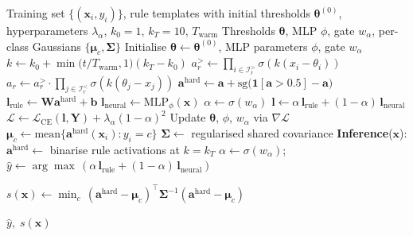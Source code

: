 \documentclass[conference]{IEEEtran}
\begin{document}
\begin{algorithm}[!ht]
\caption{NeSy-NIDS Training and OOD Scoring}
\label{alg:nesy}
\begin{algorithmic}[1]
\Require Training set $\{(\mathbf{x}_i, y_i)\}$, rule templates with
         initial thresholds $\boldsymbol{\theta}^{(0)}$,
         hyperparameters $\lambda_\alpha$,
         $k_0{=}1$, $k_T{=}10$, $T_{\mathrm{warm}}$
\Ensure  Thresholds $\boldsymbol{\theta}$, MLP $\phi$, gate $w_\alpha$,
         per-class Gaussians $\{\boldsymbol{\mu}_c, \boldsymbol{\Sigma}\}$
\State Initialise $\boldsymbol{\theta} \gets \boldsymbol{\theta}^{(0)}$,
       MLP parameters $\phi$, gate $w_\alpha$
  \State $k \gets k_0 + \min\!\bigl(t/T_{\mathrm{warm}},1\bigr)(k_T - k_0)$
      \State $a_r^{>} \gets \prod_{i\in\mathcal{I}_r^{>}}\!\sigma(k(x_i{-}\theta_i))$
      \State $a_r \gets a_r^{>} \cdot \prod_{j\in\mathcal{I}_r^{<}}\!\sigma(k(\theta_j{-}x_j))$
    \EndFor
    \State $\mathbf{a}^{\!\mathrm{hard}} \gets \mathbf{a}
           + \mathrm{sg}\!\bigl(\mathbf{1}[\mathbf{a}{>}0.5]-\mathbf{a}\bigr)$
    \State $\mathbf{l}_{\mathrm{rule}} \gets \mathbf{W}\mathbf{a}^{\mathrm{hard}}\!+\!\mathbf{b}$
    \State $\mathbf{l}_{\mathrm{neural}} \gets \mathrm{MLP}_\phi(\mathbf{x})$
    \State $\alpha \gets \sigma(w_\alpha)$
    \State $\mathbf{l} \gets \alpha\,\mathbf{l}_{\mathrm{rule}} + (1{-}\alpha)\,\mathbf{l}_{\mathrm{neural}}$
    \State $\mathcal{L} \gets \mathcal{L}_{\mathrm{CE}}(\mathbf{l},\mathbf{Y}) + \lambda_\alpha(1{-}\alpha)^2$
    \State Update $\boldsymbol{\theta}$, $\phi$, $w_\alpha$ via $\nabla\mathcal{L}$
  \EndFor
\EndFor
{} 
  \State $\boldsymbol{\mu}_c \gets \mathrm{mean}\{\mathbf{a}^{\mathrm{hard}}(\mathbf{x}_i) : y_i = c\}$
\EndFor
\State $\boldsymbol{\Sigma} \gets$ regularised shared covariance
\Statex
\Statex \textbf{Inference}($\mathbf{x}$):
\State $\mathbf{a}^{\mathrm{hard}} \gets$ binarise rule activations at $k{=}k_T$
\State $\alpha \gets \sigma(w_\alpha)$;\quad
       $\hat{y} \gets \arg\max\,(\alpha\,\mathbf{l}_{\mathrm{rule}} + (1{-}\alpha)\,\mathbf{l}_{\mathrm{neural}})$
\State \parbox[t]{\dimexpr\linewidth-\algorithmicindent}{%
  $s(\mathbf{x}) \gets \min_c\,(\mathbf{a}^{\mathrm{hard}}-\boldsymbol{\mu}_c)^\top
  \boldsymbol{\Sigma}^{-1}(\mathbf{a}^{\mathrm{hard}}-\boldsymbol{\mu}_c)$
  \hfill{}}
\State \Return $\hat{y},\; s(\mathbf{x})$
\end{algorithmic}
\end{algorithm}
\end{document}
